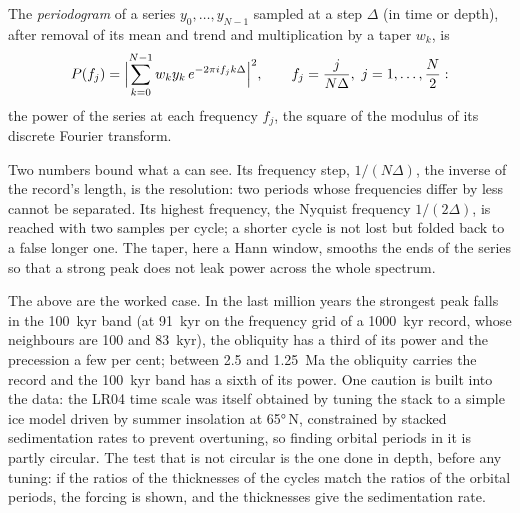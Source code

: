 \begin{omfigure}
\par{}\label{fig:b3:sequence-stratigraphy:periodogram}
\end{omfigure}

\begin{definition}[Periodogram]\label{def:b3:sequence-stratigraphy:periodogram}
The \emph{periodogram} of a series $y_0, \dots, y_{N-1}$
sampled at a step $\Delta$ (in time or depth), after removal of its mean and
trend and multiplication by a taper $w_k$, is
\[
P(f_j) = \Bigl|\sum_{k=0}^{N-1} w_k y_k\, e^{-2\pi i f_j k\Delta}\Bigr|^2,
\qquad f_j = \frac{j}{N\Delta},\ j = 1, \dots, \frac N2:
\]
the power of the series at each frequency $f_j$, the square of the modulus of
its discrete Fourier transform.
\end{definition}

Two numbers bound what a  can see. Its frequency step, $1/(N\Delta)$,
the inverse of the record's length, is the resolution: two periods whose
frequencies differ by less cannot be separated. Its highest frequency, the
Nyquist frequency $1/(2\Delta)$, is reached with two samples per cycle; a
shorter cycle is not lost but folded back to a false longer one. The taper,
here a Hann window, smooths the ends of the series so that a strong peak does
not leak power across the whole spectrum.


The  above are the worked case. In the last million years the strongest
peak falls in the \qty{100}{kyr} band (at \qty{91}{kyr} on the frequency grid
of a \qty{1000}{kyr} record, whose neighbours are 100 and \qty{83}{kyr}),
the obliquity has a third of its power and the precession a few per cent;
between 2.5 and \qty{1.25}{Ma} the obliquity carries the record and the
\qty{100}{kyr} band has a sixth of its power. One caution is built into the
data: the LR04 time scale was itself obtained by tuning the stack to a simple
ice model driven by summer insolation at \ang{65}\,N, constrained by stacked
sedimentation rates to prevent overtuning, so finding orbital periods in it
is partly circular. The test that is not circular is the one done in depth,
before any tuning: if the ratios of the thicknesses of the cycles match the
ratios of the orbital periods, the forcing is shown, and the thicknesses give
the sedimentation rate.

